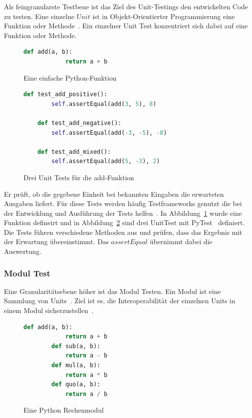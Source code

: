 Als feingranularste Testbene ist das Ziel des Unit-Testings den entwickelten Code zu testen.
Eine einzelne $Unit$ ist in Objekt-Orientierter Programmierung eine Funktion oder Methode~\cite[vgl. Unit Testing]{software-testing-craftmans}.
Ein einzelner Unit Test konzentriert sich dabei auf eine Funktion oder Methode.

\begin{figure}[h!]
    \begin{lstlisting}[language=Python]
        def add(a, b):
            return a + b
    \end{lstlisting}
    \caption{Eine einfache Python-Funktion}
    \label{unitfkt}
\end{figure}

\begin{figure}[h!]
    \begin{lstlisting}[language=Python]
    def test_add_positive():
        self.assertEqual(add(3, 5), 8)

    def test_add_negative():
        self.assertEqual(add(-3, -5), -8)

    def test_add_mixed():
        self.assertEqual(add(5, -3), 2)
    \end{lstlisting}
    \caption{Drei Unit Tests für die add-Funktion}
    \label{unitfkttest}
\end{figure}

Er prüft, ob die gegebene Einheit bei bekannten Eingaben die erwarteten Ausgaben liefert.
Für diese Tests werden häufig Testframeworks genutzt die bei der Entwicklung und Ausführung der Tests helfen~\cite{software-testing}.
In Abbildung~\ref{unitfkt} wurde eine Funktion defineirt und in Abbildung~\ref{unitfkttest} sind drei UnitTest mit PyTest~\cite{pytest} definiert.
Die Tests führen verschiedene Methoden aus und prüfen, dass das Ergebnis mit der Erwartung übereinstimmt.
Das $assertEqual$ übernimmt dabei die Auswertung.

\subsubsection{Modul Test}

Eine Granularitätsebene höher ist das Modul Testen.
Ein Modul ist eine Sammlung von Units~\cite[vgl. S. 6]{software-testing}.
Ziel ist es, die Interoperabilität der einzelnen Units in einem Modul sicherzustellen~\cite[vgl. S. 6]{software-testing}.

\begin{figure}[h!]
    \begin{lstlisting}[language=Python]
        def add(a, b):
            return a + b
        def sub(a, b):
            return a - b
        def mul(a, b):
            return a * b
        def quo(a, b):
            return a / b
    \end{lstlisting}
    \caption{Eine Python Rechenmodul}
    \label{modul}
\end{figure}

